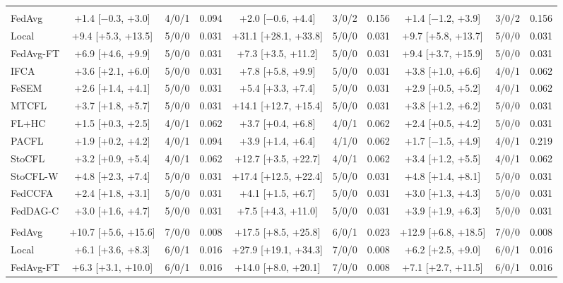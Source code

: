 {\begin{tabular}{l c c c c c c c c c}
\addlinespace
\multicolumn{10}{l}{\textit{(b) Realistic benchmarks}} \\
FedAvg & +1.4 [$-$0.3, +3.0] & 4/0/1 & 0.094 & +2.0 [$-$0.6, +4.4] & 3/0/2 & 0.156 & +1.4 [$-$1.2, +3.9] & 3/0/2 & 0.156 \\
Local & +9.4 [+5.3, +13.5] & 5/0/0 & 0.031 & +31.1 [+28.1, +33.8] & 5/0/0 & 0.031 & +9.7 [+5.8, +13.7] & 5/0/0 & 0.031 \\
FedAvg-FT & +6.9 [+4.6, +9.9] & 5/0/0 & 0.031 & +7.3 [+3.5, +11.2] & 5/0/0 & 0.031 & +9.4 [+3.7, +15.9] & 5/0/0 & 0.031 \\
IFCA & +3.6 [+2.1, +6.0] & 5/0/0 & 0.031 & +7.8 [+5.8, +9.9] & 5/0/0 & 0.031 & +3.8 [+1.0, +6.6] & 4/0/1 & 0.062 \\
FeSEM & +2.6 [+1.4, +4.1] & 5/0/0 & 0.031 & +5.4 [+3.3, +7.4] & 5/0/0 & 0.031 & +2.9 [+0.5, +5.2] & 4/0/1 & 0.062 \\
MTCFL & +3.7 [+1.8, +5.7] & 5/0/0 & 0.031 & +14.1 [+12.7, +15.4] & 5/0/0 & 0.031 & +3.8 [+1.2, +6.2] & 5/0/0 & 0.031 \\
FL+HC & +1.5 [+0.3, +2.5] & 4/0/1 & 0.062 & +3.7 [+0.4, +6.8] & 4/0/1 & 0.062 & +2.4 [+0.5, +4.2] & 5/0/0 & 0.031 \\
PACFL & +1.9 [+0.2, +4.2] & 4/0/1 & 0.094 & +3.9 [+1.4, +6.4] & 4/1/0 & 0.062 & +1.7 [$-$1.5, +4.9] & 4/0/1 & 0.219 \\
StoCFL & +3.2 [+0.9, +5.4] & 4/0/1 & 0.062 & +12.7 [+3.5, +22.7] & 4/0/1 & 0.062 & +3.4 [+1.2, +5.5] & 4/0/1 & 0.062 \\
StoCFL-W & +4.8 [+2.3, +7.4] & 5/0/0 & 0.031 & +17.4 [+12.5, +22.4] & 5/0/0 & 0.031 & +4.8 [+1.4, +8.1] & 5/0/0 & 0.031 \\
FedCCFA & +2.4 [+1.8, +3.1] & 5/0/0 & 0.031 & +4.1 [+1.5, +6.7] & 5/0/0 & 0.031 & +3.0 [+1.3, +4.3] & 5/0/0 & 0.031 \\
FedDAG-C & +3.0 [+1.6, +4.7] & 5/0/0 & 0.031 & +7.5 [+4.3, +11.0] & 5/0/0 & 0.031 & +3.9 [+1.9, +6.3] & 5/0/0 & 0.031 \\
\addlinespace
\multicolumn{10}{l}{\textit{(c) Additional benchmarks}} \\
FedAvg & +10.7 [+5.6, +15.6] & 7/0/0 & 0.008 & +17.5 [+8.5, +25.8] & 6/0/1 & 0.023 & +12.9 [+6.8, +18.5] & 7/0/0 & 0.008 \\
Local & +6.1 [+3.6, +8.3] & 6/0/1 & 0.016 & +27.9 [+19.1, +34.3] & 7/0/0 & 0.008 & +6.2 [+2.5, +9.0] & 6/0/1 & 0.016 \\
FedAvg-FT & +6.3 [+3.1, +10.0] & 6/0/1 & 0.016 & +14.0 [+8.0, +20.1] & 7/0/0 & 0.008 & +7.1 [+2.7, +11.5] & 6/0/1 & 0.016 \\

\end{tabular}}
